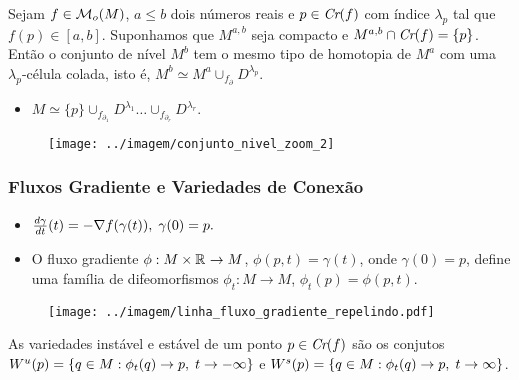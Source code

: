 \documentclass{beamer}
\begin{document}
\begin{footnotesize}
\begin{frame}
		
		\begin{teorema}
			Sejam $f\in \mathcal{M}_{o}(M)$, $a\leq b$ dois números reais e $p\in \textit{Cr}(f)$ com índice $\lambda_{p}$ tal que $f(p) \in [a,b]$. Suponhamos que $M^{a,b}$ seja compacto e $M^{a,b}\cap \textit{Cr}(f) = \{p\}$. Então o conjunto de nível $M^{b}$ tem o mesmo tipo de homotopia de $M^{a}$ com uma $\lambda_{p}$-célula colada, isto é, $M^{b} \simeq M^{a}\cup_{f_{\partial}} D^{\lambda_{p}}$.
		\end{teorema}
		
		\begin{minipage}[t]{0.5\linewidth}
			\begin{itemize}
				\item 
				$
				M \simeq \{p\}\cup_{f_{\partial_{1}}} D^{\lambda_{1}}\dots  \cup_{f_{\partial_{r}}} D^{\lambda_{r}}.
				$
			\end{itemize}
			
		\end{minipage}
		\hfil
		\begin{minipage}[t]{0.3\linewidth}
			\begin{figure}
				\centering
				\textbf{}\par
				\texttt{[image: ../imagem/conjunto\_nivel\_zoom\_2]}
			\end{figure}
			
		\end{minipage}
		
	\end{frame}
	
	\begin{frame}
		
		\frametitle{Fluxos Gradiente e Variedades de Conexão}
		
	
		\begin{itemize}
			\item 	$
			\frac{d \gamma}{d t}(t) = -\nabla f(\gamma(t)), \; \gamma(0) = p.
			$
			
			\item O fluxo gradiente $\phi:M\times \mathbb{R}^{}
			\to M$, $\phi(p,t) =\gamma(t)$, onde $\gamma(0) = p$, define uma família de difeomorfismos $\phi_{t}:M\to M$, $\phi_{t}(p) = \phi(p,t)$.
		\end{itemize}	
	
		\begin{figure}[!h]
			\centering
			\texttt{[image: ../imagem/linha\_fluxo\_gradiente\_repelindo.pdf]}
		\end{figure}
		\begin{definicao}
			As variedades instável e estável de um ponto $p \in \textit{Cr}(f)$ são os conjutos $W^{u}(p) = \{q\in M: \phi_{t}(q) \to p,\; t\to -\infty\}$ e $W^{s}(p) = \{q\in M: \phi_{t}(q) \to p,\; t\to \infty\}$.
		\end{definicao}
		

\end{frame}
\end{footnotesize}
\end{document}
